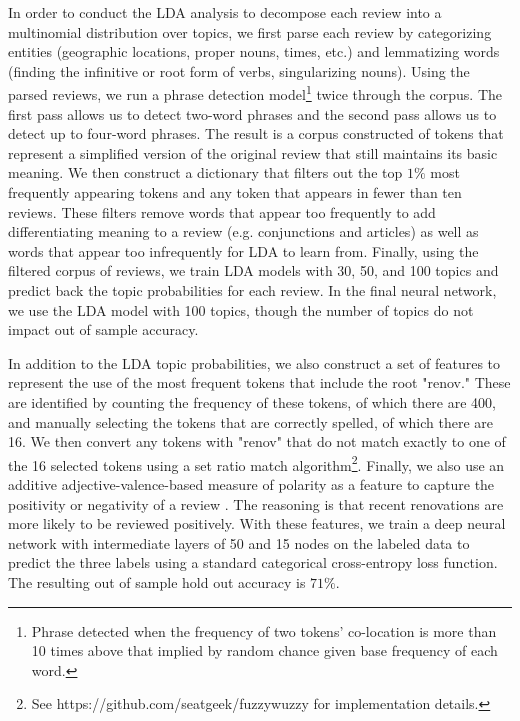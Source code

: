 \documentclass{informs_mod} %
\begin{document}
In order to conduct the LDA analysis to decompose each review into a multinomial distribution over topics, we first parse each review by categorizing entities (geographic locations, proper nouns, times, etc.) and lemmatizing words (finding the infinitive or root form of verbs, singularizing nouns). Using the parsed reviews, we run a phrase detection model\footnote{Phrase detected when the frequency of two tokens' co-location is more than 10 times above that implied by random chance given base frequency of each word.} twice through the corpus. The first pass allows us to detect two-word phrases and the second pass allows us to detect up to four-word phrases. The result is a corpus constructed of tokens that represent a simplified version of the original review that still maintains its basic meaning. We then construct a dictionary that filters out the top $1\%$ most frequently appearing tokens and any token that appears in fewer than ten reviews. These filters remove words that appear too frequently to add differentiating meaning to a review (e.g. conjunctions and articles) as well as words that appear too infrequently for LDA to learn from. Finally, using the filtered corpus of reviews, we train LDA models with 30, 50, and 100 topics and predict back the topic probabilities for each review. In the final neural network, we use the LDA model with 100 topics, though the number of topics do not impact out of sample accuracy. 

In addition to the LDA topic probabilities, we also construct a set of features to represent the use of the most frequent tokens that include the root "renov." These are identified by counting the frequency of these tokens, of which there are 400, and manually selecting the tokens that are correctly spelled, of which there are 16. We then convert any tokens with "renov" that do not match exactly to one of the 16 selected tokens using a set ratio match algorithm\footnote{See https://github.com/seatgeek/fuzzywuzzy for implementation details.}. Finally, we also use an additive adjective-valence-based measure of polarity as a feature to capture the positivity or negativity of a review \citep{desmet2012}. The reasoning is that recent renovations are more likely to be reviewed positively. With these features, we train a deep neural network with intermediate layers of 50 and 15 nodes on the labeled data to predict the three labels using a standard categorical cross-entropy loss function. The resulting out of sample hold out accuracy is $71\%$.
\end{document}
